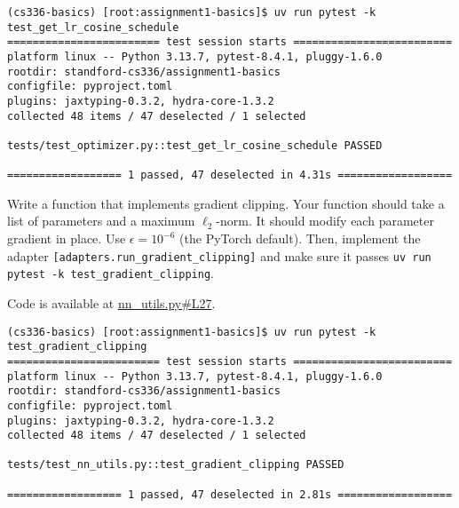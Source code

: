 \begin{lstlisting}
(cs336-basics) [root:assignment1-basics]$ uv run pytest -k test_get_lr_cosine_schedule
======================== test session starts =========================
platform linux -- Python 3.13.7, pytest-8.4.1, pluggy-1.6.0
rootdir: standford-cs336/assignment1-basics
configfile: pyproject.toml
plugins: jaxtyping-0.3.2, hydra-core-1.3.2
collected 48 items / 47 deselected / 1 selected                      

tests/test_optimizer.py::test_get_lr_cosine_schedule PASSED

================== 1 passed, 47 deselected in 4.31s ==================
\end{lstlisting}


Write a function that implements gradient clipping. Your function should take a list of parameters and a maximum $\ell_2$-norm. It should modify each parameter gradient in place. Use $\epsilon = 10^{-6}$ (the PyTorch default). Then, implement the adapter \lstinline{[adapters.run_gradient_clipping]} and make sure it passes \lstinline{uv run pytest -k test_gradient_clipping}.

\begin{answer}
Code is available at \href{https://github.com/donglinkang2021/assignment1-basics/blob/main/cs336_basics/nn_utils.py#L27}{nn\_utils.py\#L27}.
\end{answer}

\begin{lstlisting}
(cs336-basics) [root:assignment1-basics]$ uv run pytest -k test_gradient_clipping
======================== test session starts =========================
platform linux -- Python 3.13.7, pytest-8.4.1, pluggy-1.6.0
rootdir: standford-cs336/assignment1-basics
configfile: pyproject.toml
plugins: jaxtyping-0.3.2, hydra-core-1.3.2
collected 48 items / 47 deselected / 1 selected                      

tests/test_nn_utils.py::test_gradient_clipping PASSED

================== 1 passed, 47 deselected in 2.81s ==================
\end{lstlisting}
